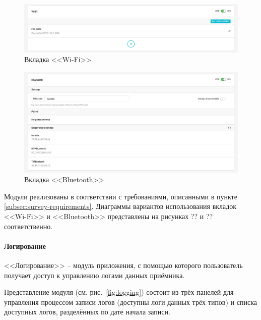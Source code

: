 \begin{figure}[h!]
  \centering
  \setlength{\fboxsep}{5pt}
  \includegraphics[width=.8\textwidth]{img/reachview/wifi_content_laptop}
  \vspace*{6pt}
  \caption{Вкладка <<Wi-Fi>>}
  \label{fig:wi-fi}
\end{figure}

\begin{figure}[h!]
  \centering
  \setlength{\fboxsep}{5pt}
  \includegraphics[width=.8\textwidth]{img/reachview/bt_content_laptop}
  \vspace*{6pt}
  \caption{Вкладка <<Bluetooth>>}
  \label{fig:bluetooth}
\end{figure}

Модули реализованы в соответствии с требованиями, описанными в пункте \ref{subsec:survey-requirements}. Диаграммы вариантов использования вкладок <<Wi-Fi>> и <<Bluetooth>> представлены на рисунках ?? и ?? соответственно.

\paragraph{Логирование}

<<Логирование>> -- модуль приложения, с помощью которого пользователь получает доступ к управлению логами данных приёмника.

Представление модуля (см. рис.~\ref{fig:logging}) состоит из трёх панелей для управления процессом записи логов (доступны логи данных трёх типов) и списка доступных логов, разделённых по дате начала записи.

